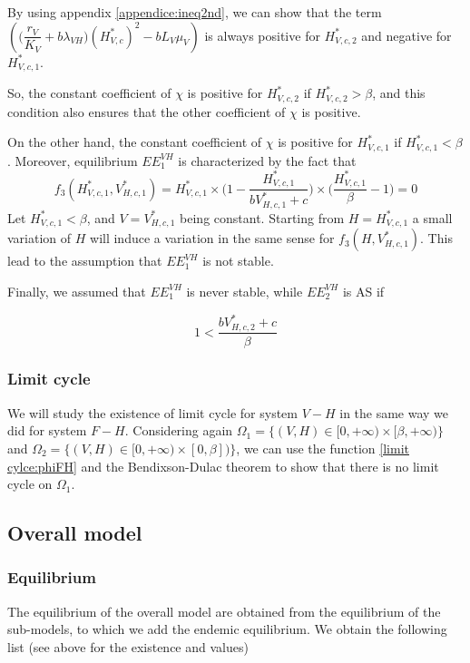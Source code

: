 \documentclass{article}
\newcommand{\lv}{\lambda_{VH}}
\begin{document}
\begin{itemize}
By using appendix \ref{appendice:ineq2nd}, we can show that the term $\left( \Big(\dfrac{r_V}{K_V} + b\lv\Big) (H^*_{V, c})^2 - b L_V \mu_V \right)$ is always positive for $H^*_{V, c, 2}$ and negative for $H^*_{V, c,1}$.

So, the constant coefficient of $\chi$ is positive for $H^*_{V, c, 2}$ if $H^*_{V, c, 2} > \beta$, and this condition also ensures that the other coefficient of $\chi$ is positive.

On the other hand, the constant coefficient of $\chi$ is positive for $H^*_{V, c, 1}$ if $H^*_{V, c, 1} < \beta$.
Moreover, equilibrium $EE^{VH}_1$ is characterized by the fact that 
\begin{equation}
f_3(H^*_{V, c, 1},V^*_{H, c, 1}) =  H^*_{V, c, 1} \times \Big(1 - \dfrac{H^*_{V, c, 1}}{bV^*_{H, c, 1} + c} \Big) \times \Big(\dfrac{H^*_{V, c, 1}}{\beta} - 1 \Big) = 0
\end{equation}
Let $H^*_{V, c, 1} < \beta$, and $V = V^*_{H, c, 1}$ being constant. Starting from $H = H^*_{V, c, 1}$ a small variation of $H$  will induce a variation in the same sense for $f_3(H, V^*_{H, c, 1})$.
This lead to the assumption that $EE^{VH}_1$ is not stable.

Finally, we assumed that $EE^{VH}_1$ is never stable, while $EE^{VH}_2$ is AS if

\begin{equation}
1 < \dfrac{bV^*_{H,c,2} + c}{\beta}
\end{equation}
\end{itemize}

\subsubsection{Limit cycle}
We will study the existence of limit cycle for system $V-H$ in the same way we did for system $F-H$. Considering again $\Omega_1 = \{(V,H) \in [0, +\infty) \times [\beta, +\infty)\}$ and $\Omega_2 = \{(V,H) \in [0, +\infty) \times [0, \beta])\}$, we can use the function \eqref{limit cylce:phiFH} and the Bendixson-Dulac theorem to show that there is no limit cycle on $\Omega_1$.



\subsection{Overall model}
\subsubsection{Equilibrium}
The equilibrium of the overall model are obtained from the equilibrium of the sub-models, to which we add the endemic equilibrium. We obtain the following list (see above for the existence and values)
\end{document}
